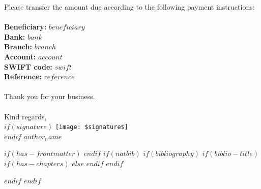 \documentclass[
  11pt,
  a4paper,
  UKenglish,
  $for(classoption)$
    $classoption$$sep$,
  $endfor$
]{$documentclass$}
\begin{document}
{\small
Please transfer the amount due according to the following payment instructions:\\
\\
\textbf{Beneficiary: } $beneficiary$\\
\textbf{Bank:} $bank$\\
\textbf{Branch:} $branch$\\
\textbf{Account:} $account$\\
\textbf{SWIFT code:} $swift$\\
\textbf{Reference:} $reference$}\\
\\
Thank you for your business.\\
\\
Kind regards,\\
$if(signature)$
\texttt{[image: \$signature\$]}\\
$endif$
$author_name$

\clearpage



\hypertarget{timesheet}{}

$if(has-frontmatter)$
\backmatter
$endif$
$if(natbib)$
$if(bibliography)$
$if(biblio-title)$
$if(has-chapters)$
\renewcommand\bibname{$biblio-title$}
$else$
\renewcommand\refname{$biblio-title$}
$endif$
$endif$

$endif$
$endif$
\end{document}
